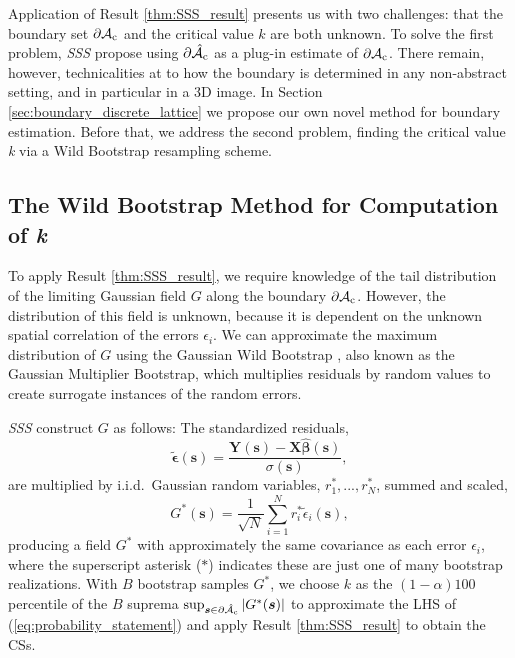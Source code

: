 Application of Result \ref{thm:SSS_result} presents us with two challenges: that the boundary set $\operatorname{\partial\mathcal{A}_{c}}$ and the critical value $k$ are both unknown.  To solve the first problem, \textit{SSS} propose using $\operatorname{\partial\hat{\mathcal{A}}_{c}}$ as a plug-in estimate of $\operatorname{\partial\mathcal{A}_{c}}$. There remain, however, technicalities at to how the boundary is determined in any non-abstract setting, and in particular in a 3D image. In Section \ref{sec:boundary_discrete_lattice} we propose our own novel method for boundary estimation. Before that, we address the second problem, finding the critical value \textit{k} via a Wild Bootstrap resampling scheme. 

\subsection{The Wild Bootstrap Method for Computation of \textit{k}}
\label{sec:wild_bootstrap}
To apply Result \ref{thm:SSS_result}, we require knowledge of the tail distribution of the limiting Gaussian field $G$ along the boundary $\operatorname{\partial\mathcal{A}_{c}}$. However, the distribution of this field is unknown, because it is dependent on the unknown spatial correlation of the errors $\epsilon_i$. We can approximate the maximum distribution of $G$ using the Gaussian Wild Bootstrap \citep{Chernozhukov2013-wz}, also known as the Gaussian Multiplier Bootstrap, which multiplies residuals by random values to create surrogate instances of the random errors.

\textit{SSS} construct $G$ as follows: The standardized residuals,
\begin{equation}
\label{eq:SSS_standardized_residuals}
\tilde{\bm{\epsilon}}(\bm{s}) = \frac{ \bm{Y}(\bm{s}) - \bm{X}\hat{\bm{\beta}}(\bm{s})}{\sigma(\bm{s})},
\end{equation}
%
are  multiplied by i.i.d.~Gaussian random variables, $r^*_1,...,r^*_N$,  summed and scaled,
\begin{equation}
\label{eq:SSS_residual_field}
G^*(\bm{s}) = \frac{1}{\sqrt{N}}\sum_{i=1}^{N} r^*_i\tilde{\epsilon}_{i}(\bm{s}),
\end{equation}
producing a field $G^*$ with approximately the same covariance as each error $\epsilon_i$, where the superscript asterisk ($*$) indicates these are just one of many bootstrap realizations. With $B$ bootstrap samples $G^*$, we choose $k$ as the $(1 - \alpha)100$ percentile of the $B$ suprema   $\sup_{\bm{s}\in\operatorname{\partial\hat{\mathcal{A}}_{c}}}|G^*(\bm{s})|$ to approximate the LHS of (\ref{eq:probability_statement}) and apply Result \ref{thm:SSS_result} to obtain the CSs. 

